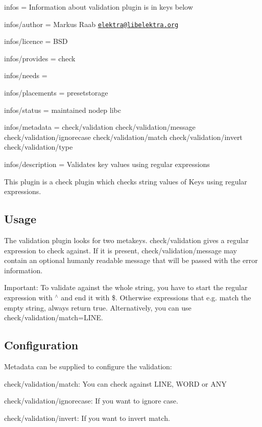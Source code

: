 
\begin{DoxyItemize}
\item infos = Information about validation plugin is in keys below
\item infos/author = Markus Raab \href{mailto:elektra@libelektra.org}{\tt elektra@libelektra.\+org}
\item infos/licence = B\+S\+D
\item infos/provides = check
\item infos/needs =
\item infos/placements = presetstorage
\item infos/status = maintained nodep libc
\item infos/metadata = check/validation check/validation/message check/validation/ignorecase check/validation/match check/validation/invert check/validation/type
\item infos/description = Validates key values using regular expressions
\end{DoxyItemize}

This plugin is a check plugin which checks string values of Keys using regular expressions.

\subsection*{Usage}

The validation plugin looks for two metakeys. {\ttfamily check/validation} gives a regular expression to check against. If it is present, {\ttfamily check/validation/message} may contain an optional humanly readable message that will be passed with the error information.

Important\+: To validate against the whole string, you have to start the regular expression with {\ttfamily $^\wedge$} and end it with {\ttfamily \$}. Otherwise expressions that e.\+g. match the empty string, always return true. Alternatively, you can use {\ttfamily check/validation/match=L\+I\+N\+E}.

\subsection*{Configuration}

Metadata can be supplied to configure the validation\+:


\begin{DoxyItemize}
\item {\ttfamily check/validation/match}\+: You can check against {\ttfamily L\+I\+N\+E}, {\ttfamily W\+O\+R\+D} or {\ttfamily A\+N\+Y}
\item {\ttfamily check/validation/ignorecase}\+: If you want to ignore case.
\item {\ttfamily check/validation/invert}\+: If you want to invert match.
\end{DoxyItemize}

